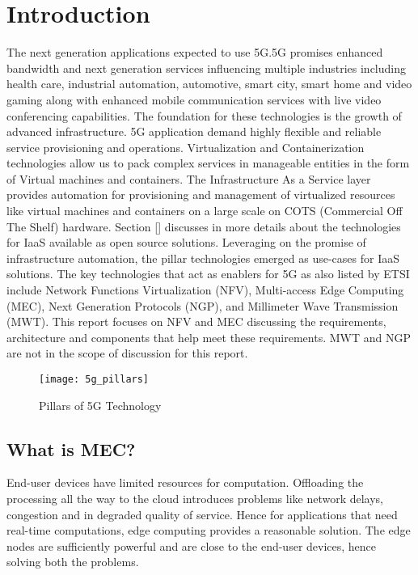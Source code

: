 \section{Introduction}


The next generation applications expected to use 5G.5G promises enhanced bandwidth and next generation services influencing multiple industries including health care, industrial automation, automotive, smart city, smart home and video gaming along with enhanced mobile communication services with live video conferencing capabilities. The foundation for these technologies is the growth of advanced infrastructure. 5G application demand highly flexible and reliable service provisioning and operations. Virtualization and Containerization technologies allow us to pack complex services in manageable entities in the form of Virtual machines and containers. The Infrastructure As a Service layer provides automation for provisioning and management of virtualized resources like virtual machines and containers on a large scale on COTS (Commercial Off The Shelf) hardware. Section [] discusses in more details about the technologies for IaaS available as open source solutions. Leveraging on the promise of infrastructure automation, the pillar technologies emerged as use-cases for IaaS solutions. The key technologies that act as enablers for 5G as also listed by ETSI include Network Functions Virtualization (NFV), Multi-access Edge Computing (MEC), Next Generation Protocols (NGP), and Millimeter Wave Transmission (MWT). This report focuses on NFV and MEC discussing the requirements, architecture and components that help meet these requirements. MWT and NGP are not in the scope of discussion for this report.

\begin{figure}
	\centering
	\texttt{[image: 5g\_pillars]}
	\label{fig:figure1}
	\caption{Pillars of 5G Technology}
\end{figure}

\subsection{What is MEC?}

End-user devices have limited resources for computation. Offloading the processing all the way to the cloud introduces problems like network delays, congestion and in degraded quality of service. Hence for applications that need real-time computations, edge computing provides a reasonable solution. The edge nodes are sufficiently powerful and are close to the end-user devices, hence solving both the problems.

